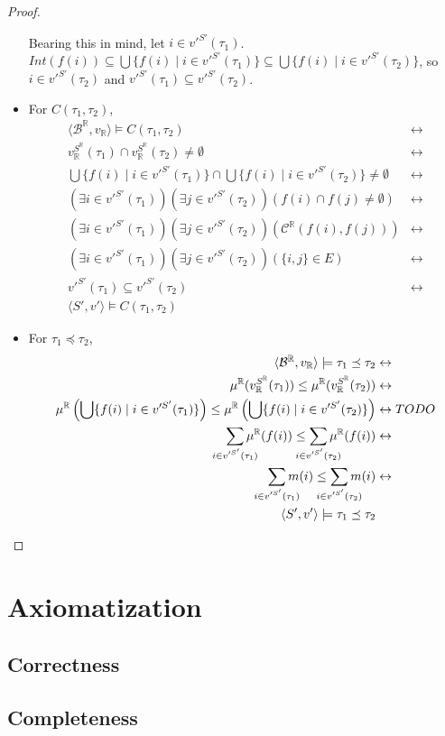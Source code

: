 \documentclass{article}
\newcommand{\R}{\mathbb{R}}
\newcommand{\B}{\mathcal{B}}
\newcommand{\bcont}{\mathcal{C}^\R}
\newcommand{\lcont}{C}
\newcommand{\lmeasure}{\preceq}
\begin{document}
\begin{proof}
\begin{itemize}
      Bearing this in mind, let $i \in v'^{S'}(\tau_1)$. $Int(f(i)) \subseteq \bigcup\{f(i) \mid i \in v'^{S'}(\tau_1)\} \subseteq \bigcup\{f(i) \mid i \in v'^{S'}(\tau_2)\}$, so $i \in v'^{S'}(\tau_2)$ and $v'^{S'}(\tau_1) \subseteq v'^{S'}(\tau_2)$.
    \item For $\lcont(\tau_1, \tau_2)$,
      \begin{align*}
        \langle \B^\R, v_\R \rangle \models \lcont(\tau_1, \tau_2) &\leftrightarrow \\
        v_\R^{S^\R}(\tau_1) \cap v_\R^{S^\R}(\tau_2) \neq \emptyset &\leftrightarrow \\
        \bigcup\{f(i) \mid i \in v'^{S'}(\tau_1)\} \cap \bigcup\{f(i) \mid i \in v'^{S'}(\tau_2)\} \neq \emptyset &\leftrightarrow \\
        (\exists i \in v'^{S'}(\tau_1))(\exists j \in v'^{S'}(\tau_2))(f(i) \cap f(j) \neq \emptyset) &\leftrightarrow \\
        (\exists i \in v'^{S'}(\tau_1))(\exists j \in v'^{S'}(\tau_2))(\bcont(f(i), f(j))) &\leftrightarrow \\
        (\exists i \in v'^{S'}(\tau_1))(\exists j \in v'^{S'}(\tau_2))(\{i, j\} \in E) &\leftrightarrow \\
        v'^{S'}(\tau_1) \subseteq v'^{S'}(\tau_2) &\leftrightarrow \\
        \langle S', v' \rangle \models \lcont(\tau_1, \tau_2)
      \end{align*}
    \item For $\tau_1 \lmeasure \tau_2$,
      \begin{align*}
        \langle \B^\R, v_\R \rangle \models \tau_1 \lmeasure \tau_2 &\leftrightarrow \\
        \mu^\R(v_\R^{S^\R}(\tau_1)) \leq \mu^\R(v_\R^{S^\R}(\tau_2)) &\leftrightarrow \\
        \mu^\R\left(\bigcup\{f(i) \mid i \in v'^{S'}(\tau_1)\}\right) \leq \mu^\R\left(\bigcup\{f(i) \mid i \in v'^{S'}(\tau_2)\}\right) &\leftrightarrow TODO \\
        \sum_{\mathclap{i \in v'^{S'}(\tau_1)}}\mu^\R(f(i)) \leq \sum_{\mathclap{i \in v'^{S'}(\tau_2)}}\mu^\R(f(i)) &\leftrightarrow \\
        \sum_{\mathclap{i \in v'^{S'}(\tau_1)}}m(i) \leq \sum_{\mathclap{i \in v'^{S'}(\tau_2)}}m(i) &\leftrightarrow \\
        \langle S', v' \rangle \models \tau_1 \lmeasure \tau_2
      \end{align*}
    \end{itemize}
\end{proof}
\section{Axiomatization}
\subsection{Correctness}
\subsection{Completeness}
\end{document}
